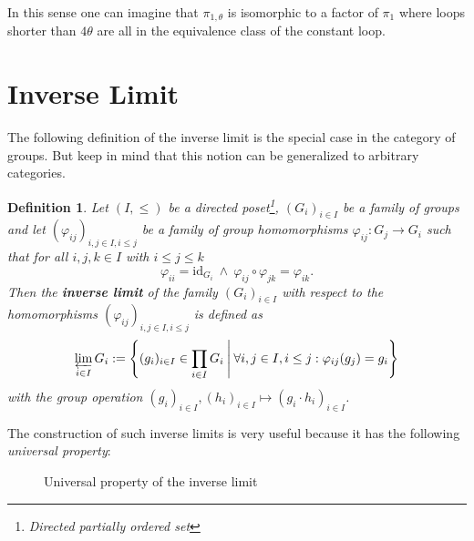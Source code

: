 \documentclass[a4paper, 11pt, twoside]{article}
\theoremstyle{break}
\theoremstyle{break}
\newtheorem{defin}[thm]{Definition}
\begin{document}
In this sense one can imagine that $\pi_{1,\theta}$ is isomorphic to a factor of $\pi_1$ where loops shorter than $4\theta$ are all in the equivalence class of the constant loop.

\section{Inverse Limit}

The following definition of the inverse limit is the special case in the category of groups. 
But keep in mind that this notion can be generalized to arbitrary categories.
\begin{defin}
  Let $(I, \leq)$ be a directed poset\footnote{Directed partially ordered set}, 
  $(G_i)_{i\in I}$ be a family of groups and let $(\varphi_{ij})_{i,j \in I, i \leq j}$ be a family of group homomorphisms $\varphi_{ij}\colon G_j \to G_i$ such that for all $i,j,k \in I$ with $i \leq j \leq k$
  \begin{equation*}
    \varphi_{ii} = \text{id}_{G_i} \: \land \: \varphi_{ij} \circ \varphi_{jk} = \varphi_{ik}.
  \end{equation*}
  Then the \textbf{inverse limit} of the family $(G_i)_{i\in I}$ with respect to the homomorphisms $(\varphi_{ij})_{i,j \in I, i \leq j}$ is defined as
  \begin{equation*}
    \varprojlim_{i\in I} G_i := \left\{(g_i)_{i\in I} \in \prod_{i\in I} G_i \: \middle| \: \forall i,j \in I, i \leq j: \varphi_{ij}(g_j) = g_i\right\}
  \end{equation*}
  with the group operation $(g_i)_{i\in I}, (h_i)_{i\in I} \mapsto (g_i \cdot h_i)_{i\in I}$.
\end{defin}

The construction of such inverse limits is very useful because it has the following \textit{universal property}:
\begin{figure}[ht!]
  \centering
  \caption{Universal property of the inverse limit}\label{fig:inverse-limit}
\end{figure}
\end{document}
